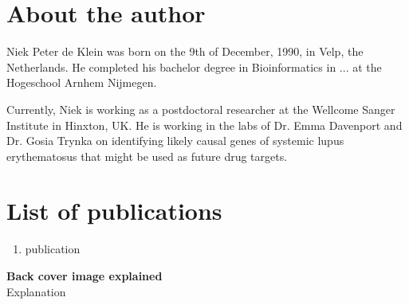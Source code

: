 \begin{appendices}
\chapter{About the author}

Niek Peter de Klein was born on the 9th of December, 1990, in Velp, the Netherlands. He completed his bachelor degree in Bioinformatics in ... at the Hogeschool Arnhem Nijmegen. 


Currently, Niek is working as a postdoctoral researcher at the Wellcome Sanger Institute in Hinxton, UK. He is working in the labs of Dr. Emma Davenport and Dr. Gosia Trynka on identifying likely causal genes of systemic lupus erythematosus that might be used as future drug targets.

\chapter{List of publications}

\begin{enumerate}
\item publication
\end{enumerate}



\end{appendices}

\clearpage
\pagestyle{empty}

\noindent
\textbf{Back cover image explained}\\
Explanation

